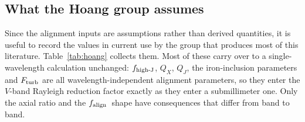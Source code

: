 \documentclass{my_memo}
\newcommand{\falign}{\ensuremath{f_{\rm align}}}
\newcommand{\fhighJ}{\ensuremath{f_{\rm high\text{-}J}}}
\begin{document}
\subsection{What the Hoang group assumes}
\label{sec:hoangvalues}

Since the alignment inputs are assumptions rather than derived
quantities, it is useful to record the values in current use by the
group that produces most of this literature. Table~\ref{tab:hoang}
collects them. Most of these carry over to a single-wavelength
calculation unchanged: \fhighJ, $Q_X$, $Q_J$, the iron-inclusion
parameters and $F_{\rm turb}$ are all wavelength-independent alignment
parameters, so they enter the $V$-band Rayleigh reduction factor exactly
as they enter a submillimeter one. Only the axial ratio and the \falign\
shape have consequences that differ from band to band.
\end{document}
